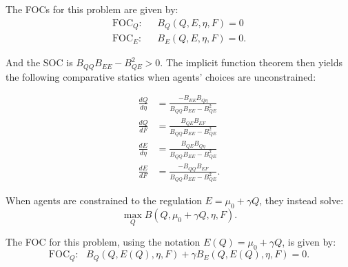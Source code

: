 \documentclass[12pt]{article}
\begin{document}
The FOCs for this problem are given by:
\begin{align}
\text{FOC}_Q:& \text{ } B_Q(Q,E,\eta,F)=0  \\
\text{FOC}_E:& \text{ } B_E(Q,E,\eta,F)=0.
\end{align}

And the SOC is $B_{QQ}B_{EE}-B_{QE}^2>0$. The implicit function theorem then yields the following comparative statics when agents' choices are unconstrained:

\begin{align}
\frac{dQ}{d\eta}&=\frac{-B_{EE}B_{Q\eta}}{B_{QQ}B_{EE}-B_{QE}^2} \label{eq:A1_dQdeta_u} \\
\frac{dQ}{dF}&=\frac{B_{QE}B_{EF}}{B_{QQ}B_{EE}-B_{QE}^2} \label{en:A1_dQdF_u} \\
\frac{dE}{d\eta}&=\frac{B_{QE}B_{Q\eta}}{B_{QQ}B_{EE}-B_{QE}^2} \label{eq:A1_dEdeta_u} \\
\frac{dE}{dF}&=\frac{-B_{QQ}B_{EF}}{B_{QQ}B_{EE}-B_{QE}^2}. \label{eq:A1_dEdF_u} 
\end{align}

When agents are constrained to the regulation $E=\mu_0+\gamma Q$, they instead solve:
\begin{equation}
\max_{Q} B(Q,\mu_0+\gamma Q,\eta,F).
\end{equation}

The FOC for this problem, using the notation $E(Q)=\mu_0+\gamma Q$, is given by:
\begin{equation}
\text{FOC}_Q: \text{ } B_Q(Q,E(Q),\eta,F)+\gamma B_E(Q,E(Q),\eta,F)=0. \label{eq:A1_FOCQ_c}
\end{equation}
\end{document}
